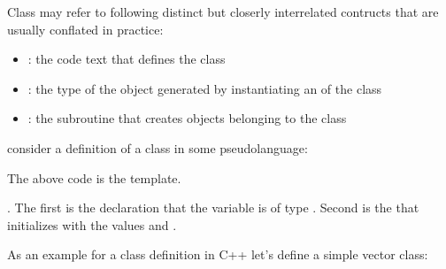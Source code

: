 \documentclass[a4paper,10pt,english]{jupyterBook}
\begin{document}
\sphinxAtStartPar
Class may refer to following distinct but closerly interrelated contructs that
are usually conflated in practice:
\begin{itemize}
\item {} 
\sphinxAtStartPar
{}: the code text that defines the class

\item {} 
\sphinxAtStartPar
{}: the type of the object generated by instantiating an  of the class

\item {} 
\sphinxAtStartPar
{}: the subroutine that creates objects belonging to the class

\end{itemize}

\sphinxAtStartPar
consider a definition of a class in some pseudo\sphinxhyphen{}language:

\begin{sphinxVerbatim}[commandchars=\\\{\}]
 
     
     

     
     
\end{sphinxVerbatim}

\sphinxAtStartPar
The above code is the template.

\sphinxAtStartPar
{}. The first  is the  declaration that the variable  is of type . Second  is the  that initializes  with the values  and .

\sphinxAtStartPar
As an example for a class definition in C++ let’s define a simple vector class:
\end{document}
